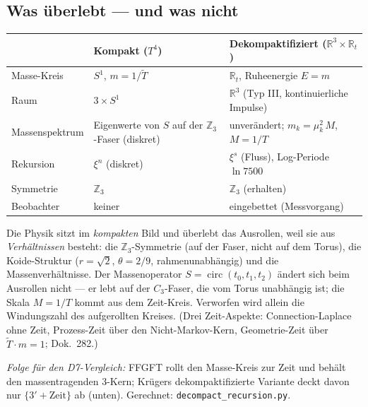 \subsection{Was \"uberlebt --- und was nicht}
\begin{center}
\begin{tabular}{@{}p{3.1cm} p{4.4cm} p{4.9cm}@{}}
\toprule
 & Kompakt ($T^4$) & Dekompaktifiziert ($\mathbb{R}^3\times\mathbb{R}_t$) \\
\midrule
Masse-Kreis & $S^1$, $m=1/\tilde{T}$ & $\mathbb{R}_t$, Ruheenergie $E=m$ \\
Raum & $3\times S^1$ & $\mathbb{R}^3$ (Typ III, kontinuierliche Impulse) \\
Massenspektrum & Eigenwerte von $S$ auf der $\mathbb{Z}_3$-Faser (diskret) & unver\"andert; $m_k=\mu_k^2\,M$, $M=1/T$ \\
Rekursion & $\xi^n$ (diskret) & $\xi^s$ (Fluss), Log-Periode $\ln 7500$ \\
Symmetrie & $\mathbb{Z}_3$ & $\mathbb{Z}_3$ (erhalten) \\
Beobachter & keiner & eingebettet (Messvorgang) \\
\bottomrule
\end{tabular}
\end{center}

Die Physik sitzt im \emph{kompakten} Bild und \"uberlebt das Ausrollen, weil sie aus \emph{Verh\"altnissen}
besteht: die $\mathbb{Z}_3$-Symmetrie (auf der Faser, nicht auf dem Torus), die Koide-Struktur
($r=\sqrt2$, $\theta=2/9$, rahmenunabh\"angig) und die Massenverh\"altnisse. Der Massenoperator
$S=\operatorname{circ}(t_0,t_1,t_2)$ \"andert sich beim Ausrollen nicht --- er lebt auf der
$C_3$-Faser, die vom Torus unabh\"angig ist; die Skala $M=1/T$ kommt aus dem Zeit-Kreis. Verworfen
wird allein die Windungszahl des aufgerollten Kreises. (Drei Zeit-Aspekte: Connection-Laplace ohne
Zeit, Prozess-Zeit \"uber den Nicht-Markov-Kern, Geometrie-Zeit \"uber $\tilde{T}\cdot m=1$; Dok.~282.)

\emph{Folge f\"ur den D7-Vergleich:} FFGFT rollt den Masse-Kreis zur Zeit und beh\"alt den
massentragenden $3$-Kern; Kr\"ugers dekompaktifizierte Variante deckt davon nur $\{3'+\text{Zeit}\}$
ab (unten). Gerechnet: \texttt{decompact\_recursion.py}.

